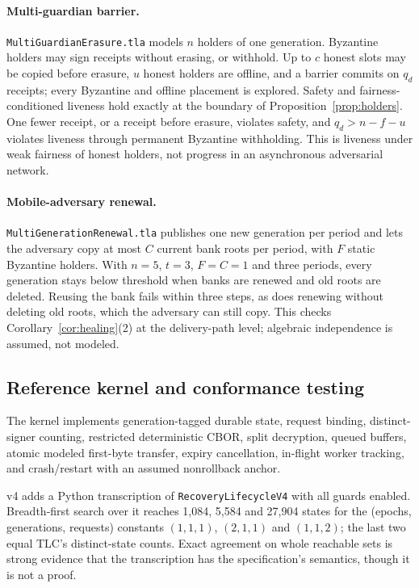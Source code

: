 \documentclass[pdflatex,sn-mathphys-num]{sn-jnl}
\theoremstyle{plain}
\theoremstyle{definition}
\newcommand{\code}[1]{\texttt{#1}}
\begin{document}
\paragraph{Multi-guardian barrier.}
\code{MultiGuardianErasure.tla} models $n$ holders of one generation. Byzantine holders may sign receipts without erasing, or withhold. Up to $c$ honest slots may be copied before erasure, $u$ honest holders are offline, and a barrier commits on $q_d$ receipts; every Byzantine and offline placement is explored. Safety and fairness-conditioned liveness hold exactly at the boundary of Proposition~\ref{prop:holders}. One fewer receipt, or a receipt before erasure, violates safety, and $q_d>n-f-u$ violates liveness through permanent Byzantine withholding. This is liveness under weak fairness of honest holders, not progress in an asynchronous adversarial network.

\paragraph{Mobile-adversary renewal.}
\code{MultiGenerationRenewal.tla} publishes one new generation per period and lets the adversary copy at most $C$ current bank roots per period, with $F$ static Byzantine holders. With $n=5$, $t=3$, $F=C=1$ and three periods, every generation stays below threshold when banks are renewed and old roots are deleted. Reusing the bank fails within three steps, as does renewing without deleting old roots, which the adversary can still copy. This checks Corollary~\ref{cor:healing}(2) at the delivery-path level; algebraic independence is assumed, not modeled.

\subsection{Reference kernel and conformance testing}
The kernel implements generation-tagged durable state, request binding, distinct-signer counting, restricted deterministic CBOR, split decryption, queued buffers, atomic modeled first-byte transfer, expiry cancellation, in-flight worker tracking, and crash/restart with an assumed nonrollback anchor.

v4 adds a Python transcription of \code{RecoveryLifecycleV4} with all guards enabled. Breadth-first search over it reaches 1,084, 5,584 and 27,904 states for the (epochs, generations, requests) constants $(1,1,1)$, $(2,1,1)$ and $(1,1,2)$; the last two equal TLC's distinct-state counts. Exact agreement on whole reachable sets is strong evidence that the transcription has the specification's semantics, though it is not a proof.
\end{document}
